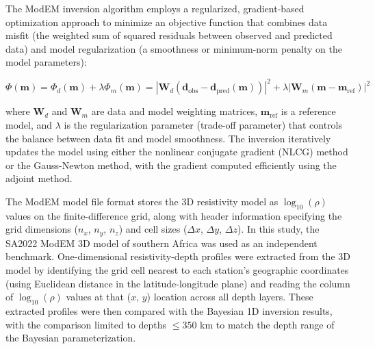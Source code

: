 The ModEM inversion algorithm employs a regularized, gradient-based optimization approach to minimize an objective function that combines data misfit (the weighted sum of squared residuals between observed and predicted data) and model regularization (a smoothness or minimum-norm penalty on the model parameters):

\begin{equation}
\Phi(\mathbf{m}) = \Phi_d(\mathbf{m}) + \lambda \Phi_m(\mathbf{m}) = |\mathbf{W}_d (\mathbf{d}_{\text{obs}} - \mathbf{d}_{\text{pred}}(\mathbf{m}))|^2 + \lambda |\mathbf{W}_m (\mathbf{m} - \mathbf{m}_{\text{ref}})|^2
\end{equation}

\noindent where $\mathbf{W}_d$ and $\mathbf{W}_m$ are data and model weighting matrices, $\mathbf{m}_{\text{ref}}$ is a reference model, and $\lambda$ is the regularization parameter (trade-off parameter) that controls the balance between data fit and model smoothness. The inversion iteratively updates the model using either the nonlinear conjugate gradient (NLCG) method or the Gauss-Newton method, with the gradient computed efficiently using the adjoint method.

The ModEM model file format stores the 3D resistivity model as $\log_{10}(\rho)$ values on the finite-difference grid, along with header information specifying the grid dimensions ($n_x$, $n_y$, $n_z$) and cell sizes ($\Delta x$, $\Delta y$, $\Delta z$). In this study, the SA2022 ModEM 3D model of southern Africa was used as an independent benchmark. One-dimensional resistivity-depth profiles were extracted from the 3D model by identifying the grid cell nearest to each station's geographic coordinates (using Euclidean distance in the latitude-longitude plane) and reading the column of $\log_{10}(\rho)$ values at that ($x$, $y$) location across all depth layers. These extracted profiles were then compared with the Bayesian 1D inversion results, with the comparison limited to depths $\leq 350$ km to match the depth range of the Bayesian parameterization.

